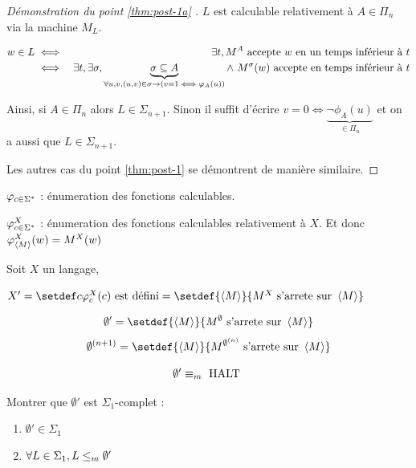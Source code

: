 \begin{proof}[Démonstration du point \ref{thm:post-1a} \bimpRL]

	$L$ est calculable relativement à $A \in \Pi_n$ via la machine $M_L$.

	\begin{eqnarray*}
		w \in L &\iff& \exists t, M^A \text{ accepte } w \text{ en un temps inférieur à } t\\
		&\iff& \exists t, \exists \sigma,
		\underbrace{\sigma \subseteq A}_{\forall u,v, (u,v) \in \sigma \rightarrow (v=1 \iff \varphi_A(u))}
		\land\  M^{\sigma} (w) \text{ accepte en temps inférieur à }t
	\end{eqnarray*}

	Ainsi, si $A \in \Pi_n$ alors $L \in \Sigma_{n+1}$. Sinon il suffit d'écrire
	$v = 0 \iff \underbrace{\lnot \phi_A(u)}_{\in \Pi_n}$ et on a aussi que $L \in \Sigma_{n+1}$.

	Les autres cas du point \ref{thm:post-1} se démontrent de manière similaire.
\end{proof}

\begin{notation}
	$\varphi_{c \in \Sigma^{*}}$ : énumeration des fonctions calculables.

	$\varphi_{c \in \Sigma^{*}}^X$ : énumeration des fonctions calculables relativement à $X$. Et donc $\varphi_{\left\langle M\right\rangle}^X(w) = M^X(w)$
\end{notation}

\begin{definition}
	Soit $X$ un langage,

	$X' = \setdef c {\phi_c^X(c) \text{ est défini}} = \setdef {\encode M} {M^X \text{ s'arrete sur } \encode M}$

\end{definition}

\begin{definition}
	$$\emptyset' = \setdef {\encode M} {M^{\emptyset} \text{ s'arrete sur } \encode M}$$
	$$\emptyset^{(n+1)} = \setdef {\encode M} {M^{\emptyset^{(n)}} \text{ s'arrete sur } \encode M} $$
\end{definition}


\begin{remarque}
	$$\emptyset' \equiv_m \text{ HALT }$$
\end{remarque}

\begin{exercice}
	Montrer que $\emptyset '$ est $\Sigma_1$-complet :
	\begin{enumerate}
		\item $\emptyset' \in \Sigma_1$
		\item $\forall L \in \Sigma_1, L \leq_m \emptyset'$
	\end{enumerate}
\end{exercice}

